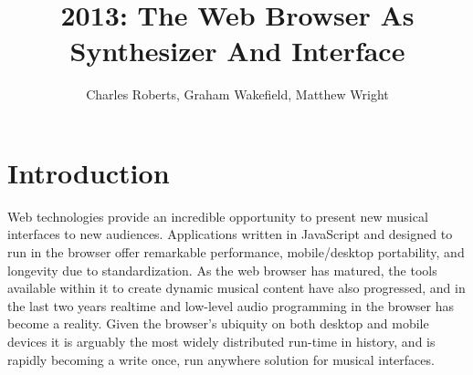 
\graphicspath{ {mainmatter/Roberts_2013/} }


\title*{2013: The Web Browser As Synthesizer And Interface}


\author{Charles Roberts, Graham Wakefield, Matthew Wright}


%
%
\maketitle


\section{Introduction}
Web technologies provide an incredible opportunity to present new musical interfaces to new audiences. Applications written in JavaScript and designed to run in the browser offer remarkable performance, mobile/desktop portability, and longevity due to standardization. As the web browser has matured, the tools available within it to create dynamic musical content have also progressed, and in the last two years realtime and low-level audio programming in the browser has become a reality. Given the browser's ubiquity on both desktop and mobile devices it is arguably the most widely distributed run-time in history, and is rapidly becoming a write once, run anywhere solution for musical interfaces. 

